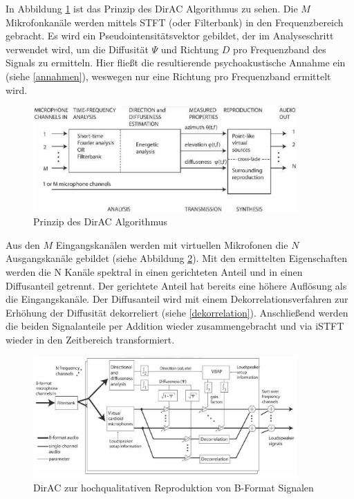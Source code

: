 In Abbildung \ref{fig:dirac_flow_general} ist das Prinzip des DirAC Algorithmus zu sehen. Die $M$ Mikrofonkanäle werden mittels STFT (oder Filterbank) in den Frequenzbereich gebracht. Es wird ein Pseudointensitätsvektor gebildet, der im Analyseschritt verwendet wird, um die Diffusität $\Psi$ und Richtung $D$ pro Frequenzband des Signals zu ermitteln. Hier fließt die resultierende psychoakustische Annahme ein (siehe \ref{annahmen}), weswegen nur eine Richtung pro Frequenzband ermittelt wird.

\begin{figure}[!ht]
  \centering
  \includegraphics[width=0.9\textwidth]{funktionsweise/pic/pulkki_dirac_flow.png}
  \caption{Prinzip des DirAC Algorithmus\protect\footnotemark}
  \label{fig:dirac_flow_general}
\end{figure}


Aus den $M$ Eingangskanälen werden mit virtuellen Mikrofonen die $N$ Ausgangskanäle gebildet (siehe Abbildung \ref{fig:dirac_flow_high}). Mit den ermittelten Eigenschaften werden die N Kanäle spektral in einen gerichteten Anteil und in einen Diffusanteil getrennt. Der gerichtete Anteil hat bereits eine höhere Auflösung als die Eingangskanäle. Der Diffusanteil wird mit einem Dekorrelationsverfahren zur Erhöhung der Diffusität dekorreliert (siehe \ref{dekorrelation}). Anschließend werden die beiden Signalanteile per Addition wieder zusammengebracht und via iSTFT wieder in den Zeitbereich transformiert.

\begin{figure}[!ht]
  \centering
  \includegraphics[width=0.9\textwidth]{funktionsweise/pic/pulkki_dirac_flow_2.png}
  \caption{DirAC zur hochqualitativen Reproduktion von B-Format Signalen\protect\footnotemark}
  \label{fig:dirac_flow_high}
\end{figure}

